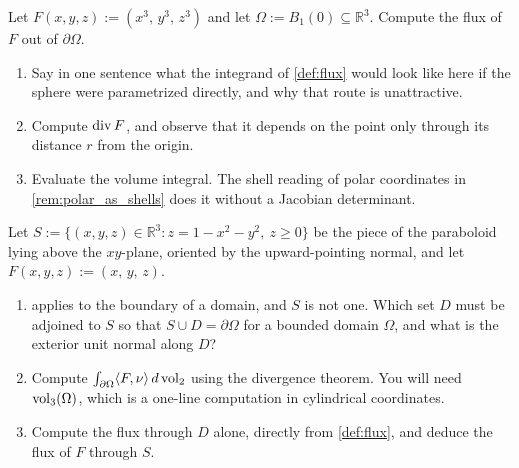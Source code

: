 \begin{aiexercise}
\label{ex:ai_flux_cubic_sphere}
Let $F(x,y,z) := (x^3,\,y^3,\,z^3)$ and let $\Omega := B_1(0) \subseteq \mathbb{R}^3$. Compute
the flux of $F$ out of $\partial\Omega$.
\begin{enumerate}[label=\textbf{(\alph*)}]
  \item Say in one sentence what the integrand of \cref{def:flux} would look like here if the
    sphere were parametrized directly, and why that route is unattractive.
  \item Compute $\operatorname{div} F$, and observe that it depends on the point only through its distance
    $r$ from the origin.
  \item Evaluate the volume integral. The shell reading of polar coordinates in
    \cref{rem:polar_as_shells} does it without a Jacobian determinant.
\end{enumerate}
\end{aiexercise}

\begin{aiexercise}
\label{ex:ai_capping_a_paraboloid}
Let $S := \{(x,y,z) \in \mathbb{R}^3 : z = 1-x^2-y^2,\ z \geq 0\}$ be the piece of the
paraboloid lying above the $xy$-plane, oriented by the upward-pointing normal, and let
$F(x,y,z) := (x,\,y,\,z)$.
\begin{enumerate}[label=\textbf{(\alph*)}]
  \item {} applies to the boundary of a domain, and $S$ is not one.
    Which set $D$ must be adjoined to $S$ so that $S \cup D = \partial\Omega$ for a bounded
    domain $\Omega$, and what is the exterior unit normal along $D$?
  \item Compute $\int_{\partial\Omega}\langle F,\nu\rangle\,d\operatorname{vol}_2$ using the divergence
    theorem. You will need $\operatorname{vol}_3(\Omega)$, which is a one-line computation in cylindrical
    coordinates.
  \item Compute the flux through $D$ alone, directly from \cref{def:flux}, and deduce the flux
    of $F$ through $S$.
\end{enumerate}
\end{aiexercise}


